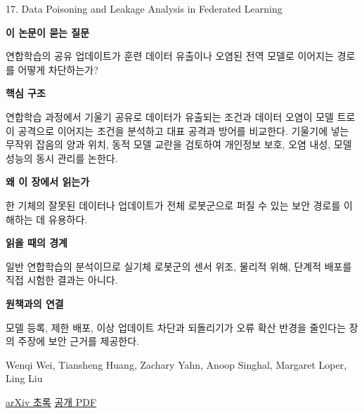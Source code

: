 \documentclass[11pt,openany]{book}
\begin{document}
\begin{termcard}{17. Data Poisoning and Leakage Analysis in Federated Learning}

\par

\medskip

{\sffamily\bfseries\color{deepblue} 이 논문이 묻는 질문}\par

연합학습의 공유 업데이트가 훈련 데이터 유출이나 오염된 전역 모델로 이어지는 경로를 어떻게 차단하는가?

\smallskip

{\sffamily\bfseries\color{deepblue} 핵심 구조}\par

연합학습 과정에서 기울기 공유로 데이터가 유출되는 조건과 데이터 오염이 모델 트로이 공격으로 이어지는 조건을 분석하고 대표 공격과 방어를 비교한다. 기울기에 넣는 무작위 잡음의 양과 위치, 동적 모델 교란을 검토하여 개인정보 보호, 오염 내성, 모델 성능의 동시 관리를 논한다.

\smallskip

{\sffamily\bfseries\color{deepblue} 왜 이 장에서 읽는가}\par

한 기체의 잘못된 데이터나 업데이트가 전체 로봇군으로 퍼질 수 있는 보안 경로를 이해하는 데 유용하다.

\smallskip

{\sffamily\bfseries\color{coral} 읽을 때의 경계}\par

일반 연합학습의 분석이므로 실기체 로봇군의 센서 위조, 물리적 위해, 단계적 배포를 직접 시험한 결과는 아니다.

\smallskip

{\sffamily\bfseries\color{teal} 원책과의 연결}\par

모델 등록, 제한 배포, 이상 업데이트 차단과 되돌리기가 오류 확산 반경을 줄인다는 장의 주장에 보안 근거를 제공한다.

\medskip

{\footnotesize\color{muted} Wenqi Wei, Tiansheng Huang, Zachary Yahn, Anoop Singhal, Margaret Loper, Ling Liu\par

\href{https://arxiv.org/abs/2409.13004}{arXiv 초록} \quad \href{https://arxiv.org/pdf/2409.13004}{공개 PDF}\par}

\end{termcard}
\end{document}
